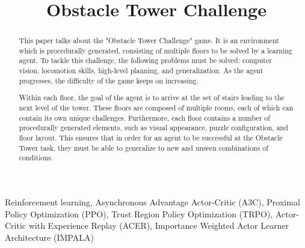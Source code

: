 \documentclass[conference]{IEEEtran}
\begin{document}
\title{Obstacle Tower Challenge}

\author{
\and
{}
\and
{}
\and
{}
}

\maketitle

\begin{abstract}
This paper talks about the "Obstacle Tower Challenge" game. It is an environment which is procedurally generated, consisting of multiple floors to be solved by a learning agent. To tackle this challenge, the following problems must be solved: computer vision, locomotion skills, high-level planning, and generalization. As the agent progresses, the difficulty of the game keeps on increasing.

Within each floor, the goal of the agent is to arrive at the set of stairs leading to the next level of the tower. These floors are composed of multiple rooms, each of which can contain its own unique challenges. Furthermore, each floor contains a number of procedurally generated elements, such as visual appearance, puzzle configuration, and floor layout. This ensures that in order for an agent to be successful at the Obstacle Tower task, they must be able to generalize to new and unseen combinations of conditions.
\end{abstract}

\begin{IEEEkeywords}
Reinforcement learning, Asynchronous Advantage Actor-Critic (A3C), Proximal Policy Optimization (PPO), Trust Region Policy Optimization (TRPO), Actor-Critic with Experience Replay (ACER), Importance Weighted Actor Learner Architecture (IMPALA)
\end{IEEEkeywords}
\end{document}
